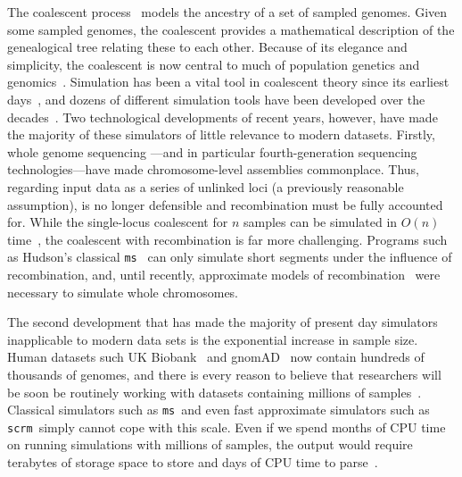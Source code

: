 \documentclass{article}
\newcommand{\ms}[0]{\texttt{ms}}
\newcommand{\scrm}[0]{\texttt{scrm}}
\begin{document}
The coalescent
process~\citep{kingman1982coalescent,hudson1983testing,tajima1983evolutionary}
models the ancestry of a set of sampled genomes. Given some sampled
genomes, the coalescent provides a mathematical description of the
genealogical tree relating these to each other. Because of its
elegance and simplicity, the coalescent is now central to much of
population genetics and
genomics~\citep{hudson1990gene,hein2004gene,wakely2008coalescent}.
Simulation has been a vital
tool in coalescent theory since its earliest days~\citep{hudson1983testing},
and dozens of different simulation tools have been
developed over the decades~\citep{carvajal2008simulation,liu2008survey,
arenas2012simulation,yuan2012overview,hoban2012computer}.
Two technological developments of recent years, however, have made the majority
of these simulators of little relevance to modern datasets.
Firstly, whole genome sequencing ---and in particular fourth-generation
sequencing technologies---have made chromosome-level assemblies
commonplace. Thus, regarding input data as a series of unlinked loci
(a previously reasonable assumption), is no longer defensible and
recombination must be fully accounted for. While the
single-locus coalescent for $n$ samples can be simulated in $O(n)$
time~\citep{hudson1990gene}, the coalescent with recombination is
far more challenging.
Programs such as Hudson's classical \ms~\citep{hudson2002generating}
can only simulate short segments under the influence of recombination,
and, until recently, approximate models of
recombination~\citep{mcvean2005approximating,staab2015scrm}
were necessary to simulate whole chromosomes.

The second development that has made the majority of
present day simulators inapplicable to modern data sets is the
exponential increase in sample size. Human datasets such
UK Biobank~\citep{bycroft2018genome} and
gnomAD~\citep{karczewski2019variation} now contain hundreds of
thousands of genomes, and there is every reason to believe that
researchers will be soon be routinely working with
datasets containing millions of samples~\citep{stephens2015big}.
Classical simulators such as \ms\ and even fast approximate simulators
such as \scrm\ simply cannot cope with this scale. Even if we
spend months of CPU time on running simulations with millions of samples,
the output would require terabytes of storage space to store and
days of CPU time to parse~\citep{kelleher2016efficient}.
\end{document}
